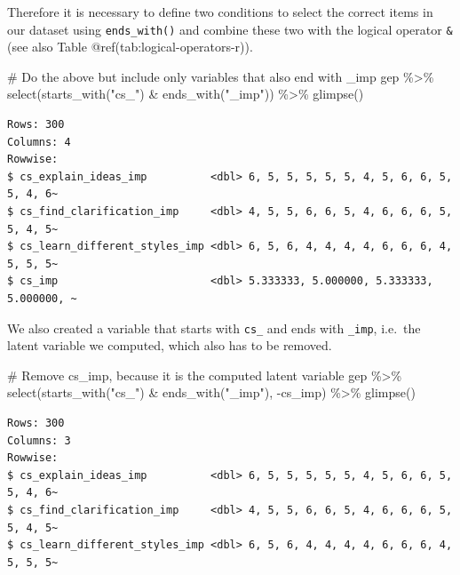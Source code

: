 \documentclass[
  letterpaper,
]{krantz}
\makeatletter
\newenvironment{Shaded}{\begin{snugshade}}{\end{snugshade}}
\newcommand{\CommentTok}[1]{\textcolor[rgb]{0.37,0.37,0.37}{#1}}
\newcommand{\FunctionTok}[1]{\textcolor[rgb]{0.28,0.35,0.67}{#1}}
\newcommand{\NormalTok}[1]{\textcolor[rgb]{0.00,0.23,0.31}{#1}}
\newcommand{\SpecialCharTok}[1]{\textcolor[rgb]{0.37,0.37,0.37}{#1}}
\newcommand{\StringTok}[1]{\textcolor[rgb]{0.13,0.47,0.30}{#1}}
\newenvironment{kframe}{%
\medskip{}
\setlength{\fboxsep}{.8em}
 \def\at@end@of@kframe{}%
 \ifinner\ifhmode%
  \def\at@end@of@kframe{\end{minipage}}%
  \begin{minipage}{\columnwidth}%
 \fi\fi%
 \def\FrameCommand##1{\hskip\@totalleftmargin \hskip-\fboxsep
 \colorbox{shadecolor}{##1}\hskip-\fboxsep
     \hskip-\linewidth \hskip-\@totalleftmargin \hskip\columnwidth}%
 \MakeFramed {\advance\hsize-\width
   \@totalleftmargin\z@ \linewidth\hsize
   \@setminipage}}%
 {\par\unskip\endMakeFramed%
 \at@end@of@kframe}
\renewenvironment{Shaded}{\begin{kframe}}{\end{kframe}}
\makeatother
\begin{document}
Therefore it is necessary to define two conditions to select the correct
items in our dataset using \texttt{ends\_with()} and combine these two
with the logical operator \texttt{\&} (see also Table
@ref(tab:logical-operators-r)).

\begin{Shaded}
\begin{Highlighting}[]
\CommentTok{\# Do the above but include only variables that also end with \textquotesingle{}\_imp\textquotesingle{}}
\NormalTok{gep }\SpecialCharTok{\%\textgreater{}\%}
  \FunctionTok{select}\NormalTok{(}\FunctionTok{starts\_with}\NormalTok{(}\StringTok{"cs\_"}\NormalTok{) }\SpecialCharTok{\&} \FunctionTok{ends\_with}\NormalTok{(}\StringTok{"\_imp"}\NormalTok{)) }\SpecialCharTok{\%\textgreater{}\%}
  \FunctionTok{glimpse}\NormalTok{()}
\end{Highlighting}
\end{Shaded}

\begin{verbatim}
Rows: 300
Columns: 4
Rowwise: 
$ cs_explain_ideas_imp          <dbl> 6, 5, 5, 5, 5, 5, 4, 5, 6, 6, 5, 5, 4, 6~
$ cs_find_clarification_imp     <dbl> 4, 5, 5, 6, 6, 5, 4, 6, 6, 6, 5, 5, 4, 5~
$ cs_learn_different_styles_imp <dbl> 6, 5, 6, 4, 4, 4, 4, 6, 6, 6, 4, 5, 5, 5~
$ cs_imp                        <dbl> 5.333333, 5.000000, 5.333333, 5.000000, ~
\end{verbatim}

We also created a variable that starts with \texttt{cs\_} and ends with
\texttt{\_imp}, i.e.~the latent variable we computed, which also has to
be removed.

\begin{Shaded}
\begin{Highlighting}[]
\CommentTok{\# Remove \textquotesingle{}cs\_imp\textquotesingle{}, because it is the computed latent variable}
\NormalTok{gep }\SpecialCharTok{\%\textgreater{}\%}
  \FunctionTok{select}\NormalTok{(}\FunctionTok{starts\_with}\NormalTok{(}\StringTok{"cs\_"}\NormalTok{) }\SpecialCharTok{\&} \FunctionTok{ends\_with}\NormalTok{(}\StringTok{"\_imp"}\NormalTok{), }\SpecialCharTok{{-}}\NormalTok{cs\_imp) }\SpecialCharTok{\%\textgreater{}\%}
  \FunctionTok{glimpse}\NormalTok{()}
\end{Highlighting}
\end{Shaded}

\begin{verbatim}
Rows: 300
Columns: 3
Rowwise: 
$ cs_explain_ideas_imp          <dbl> 6, 5, 5, 5, 5, 5, 4, 5, 6, 6, 5, 5, 4, 6~
$ cs_find_clarification_imp     <dbl> 4, 5, 5, 6, 6, 5, 4, 6, 6, 6, 5, 5, 4, 5~
$ cs_learn_different_styles_imp <dbl> 6, 5, 6, 4, 4, 4, 4, 6, 6, 6, 4, 5, 5, 5~
\end{verbatim}
\end{document}
